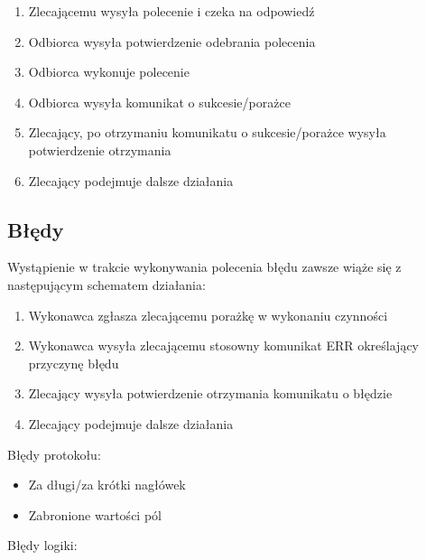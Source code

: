 \documentclass[10pt,a4paper]{article}
\begin{document}
			\begin{enumerate}
	            \item Zlecającemu wysyła polecenie i czeka na odpowiedź
	            \item Odbiorca wysyła potwierdzenie odebrania polecenia
	            \item Odbiorca wykonuje polecenie
	            \item Odbiorca wysyła komunikat o sukcesie/porażce
	            \item Zlecający, po otrzymaniu komunikatu o sukcesie/porażce wysyła potwierdzenie otrzymania
	            \item Zlecający podejmuje dalsze działania 
			\end{enumerate} 
		 
        \subsection{Błędy}
            Wystąpienie w trakcie wykonywania polecenia błędu zawsze wiąże się z następującym schematem działania:
            
            \begin{enumerate}
	            \item Wykonawca zgłasza zlecającemu porażkę w wykonaniu czynności
	            \item Wykonawca wysyła zlecającemu stosowny komunikat ERR określający przyczynę błędu
	            \item Zlecający wysyła potwierdzenie otrzymania komunikatu o błędzie
	            \item Zlecający podejmuje dalsze działania  
            \end{enumerate}
            
            Błędy protokołu:
            
            \begin{itemize}
	            \item Za długi/za krótki nagłówek
	            \item Zabronione wartości pól 
            \end{itemize}
            
            Błędy logiki:
            
\end{document}
